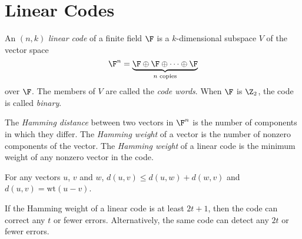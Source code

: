 \section{Linear Codes}

\begin{definition}
	An $(n,k)$ \textit{linear code} of a finite field $\F$ is a $k$-dimensional subspace $V$ of the vector space
	\[ \F^n = \underbrace{\F \oplus \F \oplus \dots \oplus \F}_\text{$n$ copies} \]
	over $\F$. The members of $V$ are called the \textit{code words}. When $\F$ is $\Z_2$, the code is called \textit{binary}.
\end{definition}

\begin{definition}
	The \textit{Hamming distance} between two vectors in $\F^n$ is the number of components in which they differ. The \textit{Hamming weight} of a vector is the number of nonzero components of the vector. The \textit{Hamming weight} of a linear code is the minimum weight of any nonzero vector in the code.
\end{definition}

\begin{theorem}
	For any vectors $u$, $v$ and $w$, $d(u,v) \leq d(u,w) + d(w,v)$ and $d(u,v) = \text{wt}(u-v)$.
\end{theorem}

\begin{theorem}
	If the Hamming weight of a linear code is at least $2t + 1$, then the code can correct any $t$ or fewer errors. Alternatively, the same code can detect any $2t$ or fewer errors.
\end{theorem}
